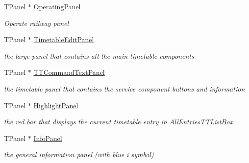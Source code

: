 \begin{DoxyCompactItemize}
\mbox{\label{class_t_interface_a9037b5b7dd4a95e2cc9b4c64ee97b015}} 
T\+Panel $\ast$ \mbox{\hyperlink{class_t_interface_a9037b5b7dd4a95e2cc9b4c64ee97b015}{Operating\+Panel}}
\begin{DoxyCompactList}\small\item\em \textquotesingle{}Operate railway\textquotesingle{} panel \end{DoxyCompactList}\item 
\mbox{\label{class_t_interface_a99b9c15c11d2620c255966f62b2b9226}} 
T\+Panel $\ast$ \mbox{\hyperlink{class_t_interface_a99b9c15c11d2620c255966f62b2b9226}{Timetable\+Edit\+Panel}}
\begin{DoxyCompactList}\small\item\em the large panel that contains all the main timetable components \end{DoxyCompactList}\item 
\mbox{\label{class_t_interface_a56dc400de815cde20ab164f65d4a57e8}} 
T\+Panel $\ast$ \mbox{\hyperlink{class_t_interface_a56dc400de815cde20ab164f65d4a57e8}{T\+T\+Command\+Text\+Panel}}
\begin{DoxyCompactList}\small\item\em the timetable panel that contains the service component buttons and information \end{DoxyCompactList}\item 
\mbox{\label{class_t_interface_abd2c189b2bb0ca543d7fcd3082ddcddb}} 
T\+Panel $\ast$ \mbox{\hyperlink{class_t_interface_abd2c189b2bb0ca543d7fcd3082ddcddb}{Highlight\+Panel}}
\begin{DoxyCompactList}\small\item\em the red bar that displays the current timetable entry in All\+Entries\+T\+T\+List\+Box \end{DoxyCompactList}\item 
\mbox{\label{class_t_interface_aa8f9a87d19b3695023f99fdc8e1c650a}} 
T\+Panel $\ast$ \mbox{\hyperlink{class_t_interface_aa8f9a87d19b3695023f99fdc8e1c650a}{Info\+Panel}}
\begin{DoxyCompactList}\small\item\em the general information panel (with blue \textquotesingle{}i\textquotesingle{} symbol) \end{DoxyCompactList}\item 

\end{DoxyCompactItemize}
